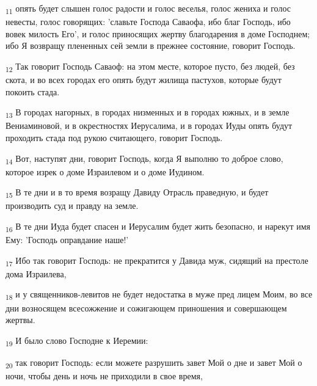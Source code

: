 \begin{tcolorbox}
\textsubscript{11} опять будет слышен голос радости и голос веселья, голос жениха и голос невесты, голос говорящих: 'славьте Господа Саваофа, ибо благ Господь, ибо вовек милость Его', и голос приносящих жертву благодарения в доме Господнем; ибо Я возвращу плененных сей земли в прежнее состояние, говорит Господь.
\end{tcolorbox}
\begin{tcolorbox}
\textsubscript{12} Так говорит Господь Саваоф: на этом месте, которое пусто, без людей, без скота, и во всех городах его опять будут жилища пастухов, которые будут покоить стада.
\end{tcolorbox}
\begin{tcolorbox}
\textsubscript{13} В городах нагорных, в городах низменных и в городах южных, и в земле Вениаминовой, и в окрестностях Иерусалима, и в городах Иуды опять будут проходить стада под рукою считающего, говорит Господь.
\end{tcolorbox}
\begin{tcolorbox}
\textsubscript{14} Вот, наступят дни, говорит Господь, когда Я выполню то доброе слово, которое изрек о доме Израилевом и о доме Иудином.
\end{tcolorbox}
\begin{tcolorbox}
\textsubscript{15} В те дни и в то время возращу Давиду Отрасль праведную, и будет производить суд и правду на земле.
\end{tcolorbox}
\begin{tcolorbox}
\textsubscript{16} В те дни Иуда будет спасен и Иерусалим будет жить безопасно, и нарекут имя Ему: 'Господь оправдание наше!'
\end{tcolorbox}
\begin{tcolorbox}
\textsubscript{17} Ибо так говорит Господь: не прекратится у Давида муж, сидящий на престоле дома Израилева,
\end{tcolorbox}
\begin{tcolorbox}
\textsubscript{18} и у священников-левитов не будет недостатка в муже пред лицем Моим, во все дни возносящем всесожжение и сожигающем приношения и совершающем жертвы.
\end{tcolorbox}
\begin{tcolorbox}
\textsubscript{19} И было слово Господне к Иеремии:
\end{tcolorbox}
\begin{tcolorbox}
\textsubscript{20} так говорит Господь: если можете разрушить завет Мой о дне и завет Мой о ночи, чтобы день и ночь не приходили в свое время,
\end{tcolorbox}
